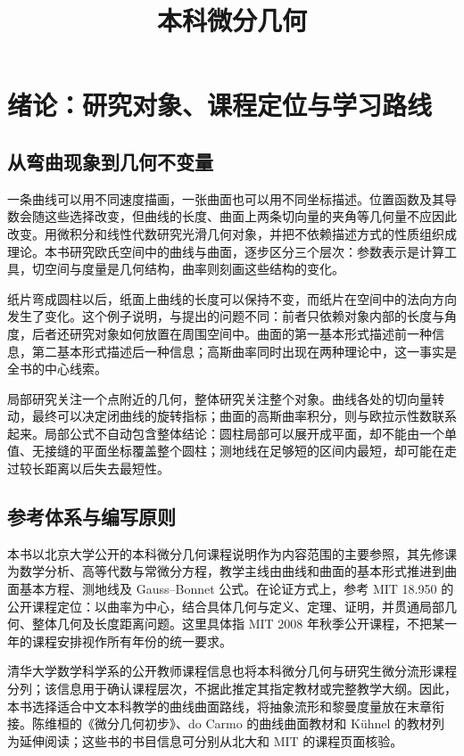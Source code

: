 \documentclass[UTF8,12pt,a4paper,fontset=fandol]{ctexbook}
\title{本科微分几何}
\author{}
\date{}
\begin{document}
\frontmatter
\maketitle
\tableofcontents

\chapter{绪论：研究对象、课程定位与学习路线}
\label{chap:dg-intro}

\section{从弯曲现象到几何不变量}
一条曲线可以用不同速度描画，一张曲面也可以用不同坐标描述。位置函数及其导数会随这些选择改变，但曲线的长度、曲面上两条切向量的夹角等几何量不应因此改变。用微积分和线性代数研究光滑几何对象，并把不依赖描述方式的性质组织成理论。本书研究欧氏空间中的曲线与曲面，逐步区分三个层次：参数表示是计算工具，切空间与度量是几何结构，曲率则刻画这些结构的变化。

纸片弯成圆柱以后，纸面上曲线的长度可以保持不变，而纸片在空间中的法向方向发生了变化。这个例子说明，与提出的问题不同：前者只依赖对象内部的长度与角度，后者还研究对象如何放置在周围空间中。曲面的第一基本形式描述前一种信息，第二基本形式描述后一种信息；高斯曲率同时出现在两种理论中，这一事实是全书的中心线索。

局部研究关注一个点附近的几何，整体研究关注整个对象。曲线各处的切向量转动，最终可以决定闭曲线的旋转指标；曲面的高斯曲率积分，则与欧拉示性数联系起来。局部公式不自动包含整体结论：圆柱局部可以展开成平面，却不能由一个单值、无接缝的平面坐标覆盖整个圆柱；测地线在足够短的区间内最短，却可能在走过较长距离以后失去最短性。

\section{参考体系与编写原则}
本书以北京大学公开的本科微分几何课程说明作为内容范围的主要参照，其先修课为数学分析、高等代数与常微分方程，教学主线由曲线和曲面的基本形式推进到曲面基本方程、测地线及 Gauss--Bonnet 公式\cite{pku-course}。在论证方式上，参考 MIT 18.950 的公开课程定位：以曲率为中心，结合具体几何与定义、定理、证明，并贯通局部几何、整体几何及长度距离问题\cite{mit-syllabus,mit-notes}。这里具体指 MIT 2008 年秋季公开课程，不把某一年的课程安排视作所有年份的统一要求。

清华大学数学科学系的公开教师课程信息也将本科微分几何与研究生微分流形课程分列\cite{tsinghua-course}；该信息用于确认课程层次，不据此推定其指定教材或完整教学大纲。因此，本书选择适合中文本科教学的曲线曲面路线，将抽象流形和黎曼度量放在末章衔接。陈维桓的《微分几何初步》、do Carmo 的曲线曲面教材和 K\"uhnel 的教材列为延伸阅读；这些书的书目信息可分别从北大和 MIT 的课程页面核验\cite{chen,docarmo,kuhnel}。
\end{document}
